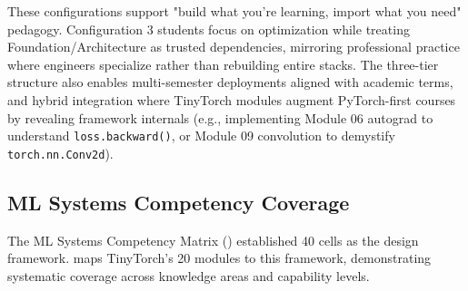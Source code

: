 \documentclass[10pt,twocolumn]{article}
\begin{document}
These configurations support "build what you're learning, import what you need" pedagogy. Configuration 3 students focus on optimization while treating Foundation/Architecture as trusted dependencies, mirroring professional practice where engineers specialize rather than rebuilding entire stacks. The three-tier structure also enables multi-semester deployments aligned with academic terms, and hybrid integration where TinyTorch modules augment PyTorch-first courses by revealing framework internals (e.g., implementing Module 06 autograd to understand \texttt{loss.backward()}, or Module 09 convolution to demystify \texttt{torch.nn.Conv2d}).

\subsection{ML Systems Competency Coverage}
\label{subsec:coverage}

The ML Systems Competency Matrix () established 40 cells as the design framework.  maps TinyTorch's 20 modules to this framework, demonstrating systematic coverage across knowledge areas and capability levels.
\end{document}
